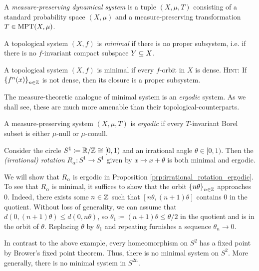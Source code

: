 \documentclass[reqno, twoside]{article}
\begin{document}
    \begin{definition}
        A \textit{measure-preserving dynamical system} is a tuple $(X,\mu,T)$ consisting of a standard probability space $(X,\mu)$ and a measure-preserving transformation $T\in\operatorname{MPT}(X,\mu)$.
    \end{definition}

    \begin{definition}
        A topological system $(X,f)$ is \textit{minimal} if there is no proper subsystem, i.e. if there is no $f$-invariant compact subspace $Y\subseteq X$.
    \end{definition}

    \begin{exercise}
        A topological system $(X,f)$ is minimal if every $f$-orbit in $X$ is dense. \textsc{Hint:} If $\left\{f^n(x)\right\}_{n\in\mathbb{Z}}$ is not dense, then its closure is a proper subsystem.
    \end{exercise}

    The measure-theoretic analogue of minimal system is an \textit{ergodic} system. As we shall see, these are much more amenable than their topological-counterparts.

    \begin{definition}
        A measure-preserving system $(X,\mu,T)$ is \textit{ergodic} if every $T$-invariant Borel subset is either $\mu$-null or $\mu$-conull.
    \end{definition}

    \begin{example}
        Consider the circle $S^1\coloneqq\mathbb{R}/\mathbb{Z}\cong[0,1)$ and an irrational angle $\theta\in[0,1)$. Then the \textit{(irrational) rotation} $R_\alpha:S^1\to S^1$ given by $x\mapsto x+\theta$ is both minimal and ergodic.

        We will show that $R_\alpha$ is ergodic in Proposition \ref{prp:irrational_rotation_ergodic}. To see that $R_\alpha$ is minimal, it suffices to show that the orbit $\left\{n\theta\right\}_{n\in\mathbb{Z}}$ approaches $0$. Indeed, there exists some $n\in\mathbb{Z}$ such that $[n\theta,(n+1)\theta]$ contains $0$ in the quotient. Without loss of generality, we can assume that $d(0,(n+1)\theta)\leq d(0,n\theta)$, so $\theta_1\coloneqq(n+1)\theta\leq\theta/2$ in the quotient and is in the orbit of $\theta$. Replacing $\theta$ by $\theta_1$ and repeating furnishes a sequence $\theta_n\to0$.
    \end{example}

    In contrast to the above example, every homeomorphism on $S^2$ has a fixed point by Brower's fixed point theorem. Thus, there is no minimal system on $S^2$. More generally, there is no minimal system in $S^{2n}$.
\end{document}
